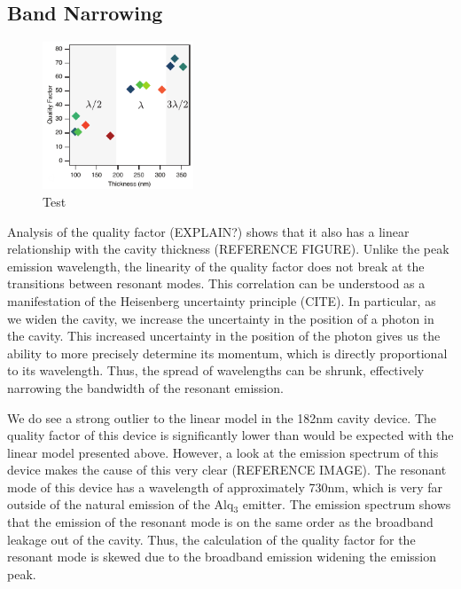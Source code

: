\documentclass{report}
\begin{document}
        \subsection{Band Narrowing}
            \begin{figure}
                \centering
                \includegraphics[width=0.4\textwidth]{images/n1_quality_factor.png}
                \caption{Test}
            \end{figure}

            Analysis of the quality factor (EXPLAIN?) shows that it also has a linear relationship with the cavity thickness (REFERENCE FIGURE). Unlike the peak emission wavelength, the linearity of the quality factor does not break at the transitions between resonant modes. This correlation can be understood as a manifestation of the Heisenberg uncertainty principle (CITE). In particular, as we widen the cavity, we increase the uncertainty in the position of a photon in the cavity. This increased uncertainty in the position of the photon gives us the ability to more precisely determine its momentum, which is directly proportional to its wavelength. Thus, the spread of wavelengths can be shrunk, effectively narrowing the bandwidth of the resonant emission.

            We do see a strong outlier to the linear model in the 182nm cavity device. The quality factor of this device is significantly lower than would be expected with the linear model presented above. However, a look at the emission spectrum of this device makes the cause of this very clear (REFERENCE IMAGE). The resonant mode of this device has a wavelength of approximately 730nm, which is very far outside of the natural emission of the Alq$_3$ emitter. The emission spectrum shows that the emission of the resonant mode is on the same order as the broadband leakage out of the cavity. Thus, the calculation of the quality factor for the resonant mode is skewed due to the broadband emission widening the emission peak.
        
\end{document}
